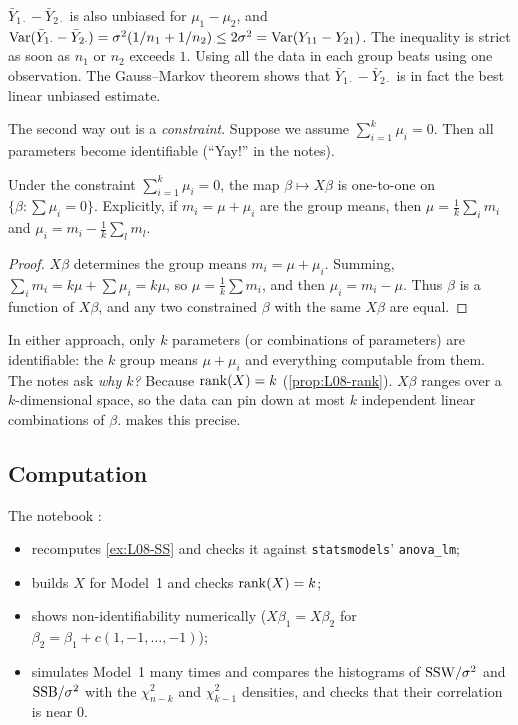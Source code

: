 \begin{note}
$\bar Y_{1\cdot}-\bar Y_{2\cdot}$ is also unbiased for $\mu_1-\mu_2$, and
$\operatorname{Var}(\bar Y_{1\cdot}-\bar Y_{2\cdot})=\sigma^2(1/n_1+1/n_2)\le 2\sigma^2=\operatorname{Var}(Y_{11}-Y_{21})$.
The inequality is strict as soon as $n_1$ or $n_2$ exceeds $1$. Using all the data in each group
beats using one observation. The Gauss--Markov theorem shows that $\bar Y_{1\cdot}-\bar Y_{2\cdot}$ is
in fact the best linear unbiased estimate.
\end{note}

The second way out is a \emph{constraint}. Suppose we assume $\sum_{i=1}^k\mu_i=0$. Then all
parameters become identifiable (``Yay!'' in the notes).

\begin{proposition}\label{prop:L08-constraint}
Under the constraint $\sum_{i=1}^k\mu_i=0$, the map $\beta\mapsto X\beta$ is one-to-one on
$\{\beta:\sum\mu_i=0\}$. Explicitly, if $m_i=\mu+\mu_i$ are the group means, then
$\mu=\frac1k\sum_i m_i$ and $\mu_i=m_i-\frac1k\sum_{l}m_l$.
\end{proposition}
\begin{proof}
$X\beta$ determines the group means $m_i=\mu+\mu_i$. Summing, $\sum_i m_i=k\mu+\sum\mu_i=k\mu$, so
$\mu=\frac1k\sum m_i$, and then $\mu_i=m_i-\mu$. Thus $\beta$ is a function of $X\beta$, and any two
constrained $\beta$ with the same $X\beta$ are equal.
\end{proof}

\begin{note}
In either approach, only $k$ parameters (or combinations of parameters) are identifiable:
the $k$ group means $\mu+\mu_i$ and everything computable from them. The notes ask
\emph{why $k$?} Because $\operatorname{rank}(X)=k$ (\cref{prop:L08-rank}). $X\beta$ ranges over a
$k$-dimensional space, so the data can pin down at most $k$ independent linear combinations of
$\beta$.  makes this precise.
\end{note}

\subsection{Computation}
The notebook :
\begin{itemize}
  \item recomputes \cref{ex:L08-SS} and checks it against \texttt{statsmodels}' \texttt{anova\_lm};
  \item builds $X$ for Model~1 and checks $\operatorname{rank}(X)=k$;
  \item shows non-identifiability numerically ($X\beta_1=X\beta_2$ for $\beta_2=\beta_1+c(1,-1,\dots,-1)$);
  \item simulates Model~1 many times and compares the histograms of $\mathrm{SSW}/\sigma^2$ and $\mathrm{SSB}/\sigma^2$ with the $\chi^2_{n-k}$ and $\chi^2_{k-1}$ densities, and checks that their correlation is near $0$.
\end{itemize}

